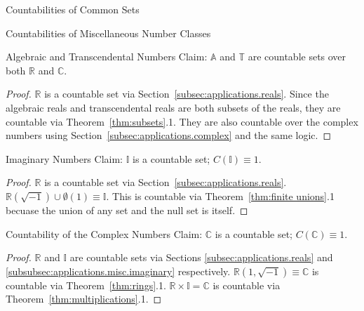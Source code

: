 \documentclass[12pt]{article}
\begin{document}
\begin{section}{Countabilities of Common Sets}
	\begin{subsection}{Countabilities of Miscellaneous Number Classes}
	\label{subsec:applications.miscellaneous}
		\begin{subsubsection}{Algebraic and Transcendental Numbers}
			\label{subsubsec:applications.misc.reals}
			Claim: $\mathbb A$ and $\mathbb T$ are countable sets over both $\mathbb R$ and $\mathbb C$.
			\begin{proof}
				$\mathbb R$ is a countable set via Section~\ref{subsec:applications.reals}.
				Since the algebraic reals and transcendental reals are both subsets of the
				reals, they are countable via Theorem~\ref{thm:subsets}.1. They are also
				countable over the complex numbers using Section~\ref{subsec:applications.complex}
				and the same logic.
			\end{proof}
		\end{subsubsection}

		\begin{subsubsection}{Imaginary Numbers}\label{subsubsec:applications.misc.imaginary}
			Claim: $\mathbb I$ is a countable set; $C(\mathbb I)\equiv1$.
			\begin{proof}
				$\mathbb R$ is a countable set via Section~\ref{subsec:applications.reals}.
				$\mathbb R(\sqrt{-1})\cup\emptyset(1)\equiv\mathbb I$. This is countable via
				Theorem~\ref{thm:finite unions}.1 becuase the union of any set and the null set
				is itself.
			\end{proof}
		\end{subsubsection}
	\end{subsection}

	\begin{subsection}{Countability of the Complex Numbers}\label{subsec:applications.complex}
		Claim: $\mathbb C$ is a countable set; $C(\mathbb C)\equiv1$.
		\begin{proof}
			$\mathbb R$ and $\mathbb I$ are countable sets via Sections \ref{subsec:applications.reals}
			and \ref{subsubsec:applications.misc.imaginary} respectively. $\mathbb R(1, \sqrt{-1})\equiv\mathbb C$
			is countable via Theorem~\ref{thm:rings}.1. $\mathbb R\times\mathbb I=\mathbb C$ is
			countable via Theorem~\ref{thm:multiplications}.1.
		\end{proof}
	\end{subsection}
\end{section}
\end{document}
